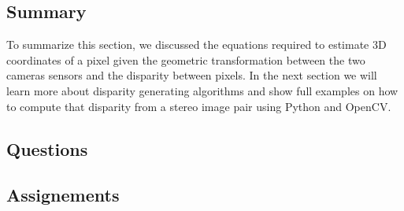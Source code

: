 \subsection{Summary}

To summarize this section,  we discussed  the equations required to estimate 3D
coordinates of a pixel given the geometric
transformation between the two cameras sensors and
the disparity between pixels. In the next section we will learn more about disparity generating algorithms and show
full examples on how to compute that disparity from a stereo image pair using Python and OpenCV.

\subsection{Questions}

\subsection{Assignements}
